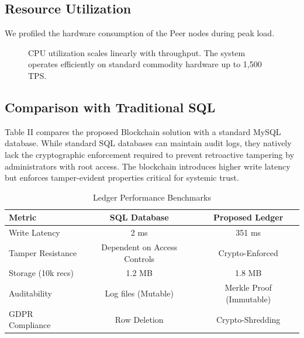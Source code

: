 \documentclass[conference]{IEEEtran}
\begin{document}
\subsection{Resource Utilization}
We profiled the hardware consumption of the Peer nodes during peak load.

\begin{figure}[htbp]
\centering
{}
\caption{CPU utilization scales linearly with throughput. The system operates efficiently on standard commodity hardware up to 1,500 TPS.}
\label{fig:cpu}
\end{figure}

\subsection{Comparison with Traditional SQL}
Table II compares the proposed Blockchain solution with a standard MySQL database. While standard SQL databases can maintain audit logs, they natively lack the cryptographic enforcement required to prevent retroactive tampering by administrators with root access. The blockchain introduces higher write latency but enforces tamper-evident properties critical for systemic trust.

\begin{table}[htbp]
\caption{Ledger Performance Benchmarks}
\begin{center}
\begin{tabular}{lcc}
\toprule
\textbf{Metric} & \textbf{SQL Database} & \textbf{Proposed Ledger} \\
\midrule
Write Latency & 2 ms & 351 ms \\
Tamper Resistance & Dependent on Access Controls & Crypto-Enforced \\
Storage (10k recs) & 1.2 MB & 1.8 MB \\
Auditability & Log files (Mutable) & Merkle Proof (Immutable) \\
GDPR Compliance & Row Deletion & Crypto-Shredding \\
\bottomrule
\end{tabular}
\end{center}
\end{table}
\end{document}
